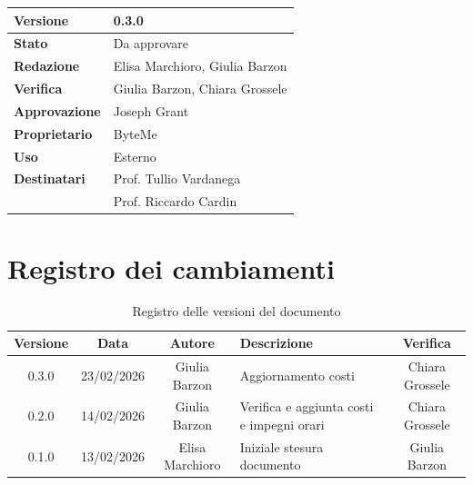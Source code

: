 \documentclass[11pt,a4paper]{article}
\begin{document}
\begin{titlepage}
    \begin{table}[H]
        \centering
        \begin{tabular}{|l|p{5cm}|}
            \hline
            \textbf{Versione} & 0.3.0 \\
            \hline
            \textbf{Stato} & Da approvare \\
            \hline
            \textbf{Redazione} & Elisa Marchioro, Giulia Barzon \\
            \hline
            \textbf{Verifica} & Giulia Barzon, Chiara Grossele\\
            \hline
            \textbf{Approvazione} & Joseph Grant \\
            \hline
            \textbf{Proprietario} & ByteMe \\
            \hline
            \textbf{Uso} & Esterno \\
            \hline
            \textbf{Destinatari} & Prof. Tullio Vardanega \\ & Prof. Riccardo Cardin \\
            \hline
        \end{tabular}
    \end{table}
    
    \vfill
\end{titlepage}

\section*{Registro dei cambiamenti}

\begin{table}[H]
    \centering
    \begin{tabularx}{\textwidth}{|c|c|c|>{\raggedright\arraybackslash}X|c|}
        \hline
        \textbf{Versione} & \textbf{Data} & \textbf{Autore} & \textbf{Descrizione} & \textbf{Verifica} \\
        \hline
        0.3.0 & 23/02/2026 & Giulia Barzon & Aggiornamento costi & Chiara Grossele\\
        \hline
        0.2.0 & 14/02/2026 & Giulia Barzon & Verifica e aggiunta costi e impegni orari & Chiara Grossele\\
        \hline
        0.1.0 & 13/02/2026 & Elisa Marchioro & Iniziale stesura documento & Giulia Barzon\\
        \hline
    \end{tabularx}
    \caption{Registro delle versioni del documento}
    \label{tab:versionamento}
\end{table}
\end{document}
